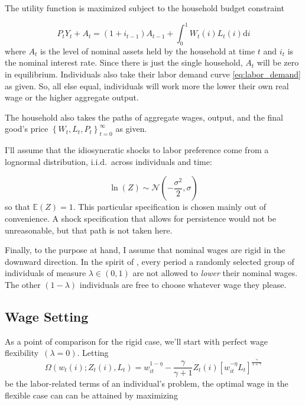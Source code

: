 \documentclass[12pt,a4paper]{scrartcl}            %
\begin{document}
The utility function is maximized subject to the household budget constraint

\begin{equation}
    \label{eq:budget}
    P_t Y_t + A_t = \left(1 + i_{t-1}\right)A_{t-1} + \int_{0}^{1}\! W_t(i)L_t(i)\mathrm{d}i
\end{equation}
%
where $A_t$ is the level of nominal assets held by the household at time $t$ and $i_t$ is the nominal interest rate.
Since there is just the single household, $A_t$ will be zero in equilibrium.
Individuals also take their labor demand curve \eqref{eq:labor_demand} as given.
So, all else equal, individuals will work more the lower their own real wage or the higher aggregate output.

The household also takes the paths of aggregate wages, output, and the final good's price $\left\{W_t, L_t, P_t \right\}_{t=0}^{\infty}$ as given.

I'll assume that the idiosyncratic shocks to labor preference come from a lognormal distribution, i.i.d.\ across individuals and time:

\begin{equation}
    \label{eq:shock_dist}
    \ln(Z) \sim \mathcal{N}\left(-\frac{\sigma^2}{2}, \sigma\right)
\end{equation}
%
so that $\mathbb{E}(Z) = 1$.
This particular specification is chosen mainly out of convenience.
A shock specification that allows for persistence would not be unreasonable, but that path is not taken here.


Finally, to the purpose at hand, I assume that nominal wages are rigid in the downward direction.
In the spirit of \cite{calvo_1983}, every period a randomly selected group of individuals of measure $\lambda \in \left(0, 1\right)$ are not allowed to \emph{lower} their nominal wages.
The other $\left(1 - \lambda \right)$ individuals are free to choose whatever wage they please.
\subsection{Wage Setting}
\label{sub:wage_setting}

As a point of comparison for the rigid case, we'll start with perfect wage flexibility~$(\lambda = 0)$.
Letting
\begin{equation}
    \label{eq:labor_part}
    \Omega( w_t(i); Z_t(i), L_t ) = w_{it}^{1 - \eta} - \frac{\gamma}{\gamma + 1}Z_t(i)\left[ w_{it}^{-\eta}L_t \right]^{\frac{\gamma}{1 + \gamma}}
\end{equation}
%
be the labor-related terms of an individual's problem, the optimal wage in the flexible case can can be attained by maximizing
\end{document}
